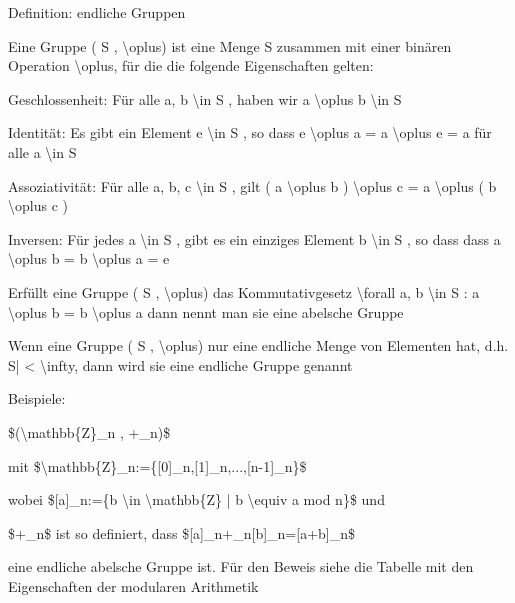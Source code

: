 \documentclass[a4paper]{article}
\begin{document}
\begin{multicols}{3}
      \begin{itemize*}
            \item Definition: endliche Gruppen
            \begin{itemize*}
                  \item Eine Gruppe ( S , \textbackslash oplus) ist eine Menge S zusammen mit einer binären Operation \textbackslash oplus, für die die folgende Eigenschaften gelten:
                  \begin{itemize*} \item Geschlossenheit: Für alle a, b \textbackslash in S , haben wir a \textbackslash oplus b \textbackslash in S \item Identität: Es gibt ein Element e \textbackslash in S , so dass e \textbackslash oplus a = a \textbackslash oplus e = a für alle a \textbackslash in S \item Assoziativität: Für alle a, b, c \textbackslash in S , gilt ( a \textbackslash oplus b ) \textbackslash oplus c = a \textbackslash oplus ( b \textbackslash oplus c ) \item Inversen: Für jedes a \textbackslash in S , gibt es ein einziges Element b \textbackslash in S , so dass dass a \textbackslash oplus b = b \textbackslash oplus a = e \end{itemize*}
                  \item Erfüllt eine Gruppe ( S , \textbackslash oplus) das Kommutativgesetz \textbackslash forall a, b \textbackslash in S : a \textbackslash oplus b = b \textbackslash oplus a dann nennt man sie eine abelsche Gruppe
                  \item Wenn eine Gruppe ( S , \textbackslash oplus) nur eine endliche Menge von Elementen hat, d.h. \textbar S| \textless{} \textbackslash infty, dann wird sie eine endliche Gruppe genannt
            \end{itemize*}
            \item Beispiele:
            \begin{itemize*}
                  \item \$(\textbackslash mathbb\{Z\}\_n , +\_n)\$
                  \begin{itemize*} \item mit \$\textbackslash mathbb\{Z\}\_n:=\{{[}0{]}\_n,{[}1{]}\_n,...,{[}n-1{]}\_n\}\$ \item wobei \${[}a{]}\_n:=\{b \textbackslash in \textbackslash mathbb\{Z\} | b \textbackslash equiv a mod n\}\$ und \item \$+\_n\$ ist so definiert, dass \${[}a{]}\_n+\_n{[}b{]}\_n={[}a+b{]}\_n\$ \item eine endliche abelsche Gruppe ist. Für den Beweis siehe die Tabelle mit den Eigenschaften der modularen Arithmetik \end{itemize*}

\end{itemize*}
\end{itemize*}
\end{multicols}
\end{document}
